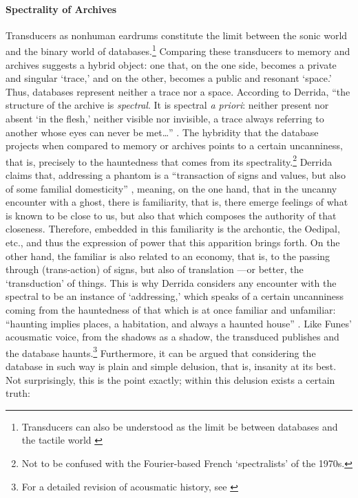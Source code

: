 \paragraph{Spectrality of Archives}
Transducers as nonhuman eardrums constitute the limit between the sonic world and the binary world of databases.\footnote{Transducers can also be understood as the limit be between databases and the tactile world \parencite[223]{Eck13:Bet}} Comparing these transducers to memory and archives suggests a hybrid object: one that, on the one side, becomes a private and singular `trace,' and on the other, becomes a public and resonant `space.' Thus, databases represent neither a trace nor a space. According to Derrida, ``the structure of the archive is \textit{spectral}. It is spectral \textit{a priori}: neither present nor absent `in the flesh,' neither visible nor invisible, a trace always referring to another whose eyes can never be met\dots'' \parencite[54]{Der95:Arc}. The hybridity that the database projects when compared to memory or archives points to a certain uncanniness, that is, precisely to the hauntedness that comes from its spectrality.\footnote{Not to be confused with the Fourier-based French `spectralists' of the 1970s.} Derrida claims that, addressing a phantom is a ``transaction of signs and values, but also of some familial domesticity'' \parencite[55]{Der95:Arc}, meaning, on the one hand, that in the uncanny encounter with a ghost, there is familiarity, that is, there emerge feelings of what is known to be close to us, but also that which composes the authority of that closeness. Therefore, embedded in this familiarity is the archontic, the Oedipal, etc., and thus the expression of power that this apparition brings forth. On the other hand, the familiar is also related to an economy, that is, to the passing through (trans-action) of signs, but also of translation ---or better, the `transduction' of things. This is why Derrida considers any encounter with the spectral to be an instance of `addressing,' which speaks of a certain uncanniness coming from the hauntedness of that which is at once familiar and unfamiliar: ``haunting implies places, a habitation, and always a haunted house'' \parencite[55]{Der95:Arc}. Like Funes' acousmatic voice, from the shadows as a shadow, the transduced publishes and the database haunts.\footnote{For a detailed revision of acousmatic history, see \textcite{Kan14:Sou}} Furthermore, it can be argued that considering the database in such way is plain and simple delusion, that is, insanity at its best. Not surprisingly, this is the point exactly; within this delusion exists a certain truth:

